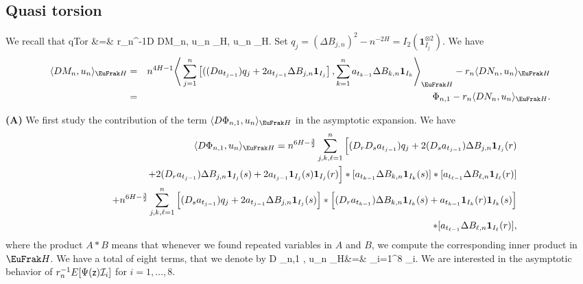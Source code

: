 \documentclass[a4paper]{article}
\numberwithin{equation}{section}
\newcommand{\sfz}{{\sf z}}
\def\HH{\EuFrak H}
\begin{document}
{ \medskip
 \noindent
\subsection{Quasi torsion}
We recall that
\beas
{\sf qTor} &=& r_n^{-1}\langle D   \langle DM_n, u_n \rangle_{\HH}, u_n \rangle_{\HH}.
\eeas
 Set $q_j= (\Delta B_{j,n})^2- n^{-2H} = I_2(  \mathbf{1}_{ I_j} ^{\otimes 2})$. We have
 \begin{eqnarray*}
 \langle DM_n, u_n \rangle_{\HH} &=& n^{4H-1} \Bigg  \langle    \sum_{j=1}^n  \left[( (D a_{t_{j-1}} )q_j +   2  a_{t_{j-1}}  \Delta B_{j,n}   \mathbf{1}_{ I_j}  \right],
  \sum_{k=1}^n  a_{t_{k-1}} \Delta  B_{k,n}   \mathbf{1}_{ I_k}  \Bigg  \rangle_{\HH}- r_n \langle DN_n, u_n \rangle_{\HH} \\
  &=& \Phi_{n,1} - r_n  \langle DN_n, u_n \rangle_{\HH}.
 \end{eqnarray*}

\medskip
\noindent
{\bf (A)}  We first study the contribution of the term $\langle D \Phi_{n,1} , u_n \rangle_{\HH}$ in the asymptotic expansion. We have
  \begin{eqnarray*}
 && 
  \langle D \Phi_{n,1} , u_n \rangle_{\HH}%
 = n^{6H-\frac 32}  \sum_{j,k,\ell=1}^n  \Big[ (D_rD_s  a_{t_{j-1}}) q_j +   2 (D_s  a_{t_{j-1}})  \Delta B_{j,n}  \mathbf{1}_{ I_j}(r)\\
 &&
 \qquad+2 (D_r  a_{t_{j-1}}) \Delta B_{j,n}   \mathbf{1}_{ I_j} (s) + 2 a_{t_{j-1}}  \mathbf{1}_{ I_j} (s)  \mathbf{1}_{ I_j} (r)    \Big] *
 [   a_{t_{k-1}} \Delta  B_{k,n}   \mathbf{1}_{ I_k} (s) ]*[a_{t_{\ell-1}} \Delta  B_{\ell,n}   \mathbf{1}_{ I_\ell} (r) ]  \\
   &&\qquad + n^{6H-\frac 32}  \sum_{j,k,\ell=1}^n   \Big[ (D_s  a_{t_{j-1}})q_j +   2  a_{t_{j-1}}  \Delta B_{j,n}   \mathbf{1}_{ I_j} (s)  \Big]* \Big[ (D_r a_{t_{k-1}}) \Delta B_{k,n}  \mathbf{1}_{ I_k} (s) +
    a_{t_{k-1}}   \mathbf{1}_{ I_k} (r) \mathbf{1}_{ I_k} (s) \Big] \\
 &&\qquad \qquad   *[ a_{t_{\ell-1}} \Delta  B_{\ell,n}   \mathbf{1}_{ I_\ell} (r)] ,
  \end{eqnarray*}
 where the product  $A*B$ means that whenever we found repeated variables in $A$ and $B$, we compute the corresponding inner product in $\HH$. We have a total of eight terms, that we denote by
 \beas
 \langle D \Phi_{n,1} , u_n \rangle_{\HH}&=& \sum_{i=1}^8 _i.
 \eeas
 We are interested in the  asymptotic behavior of $r_n^{-1}E[ \Psi(\sfz) \mathcal{I}_i]$ for $i=1,\dots, 8$.
 
}
\end{document}
